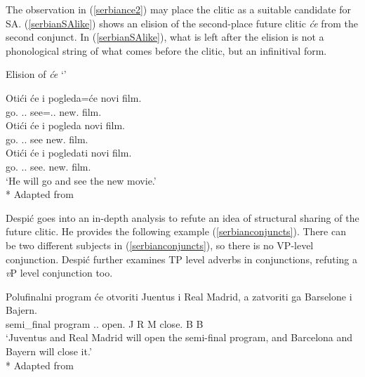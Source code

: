 The observation in (\ref{serbiance2}) may place the clitic as a suitable candidate for SA. (\ref{serbianSAlike}) shows an elision of the second-place future clitic \textit{\'{c}e} from the second conjunct. In (\ref{serbianSAlike}), what is left after the elision is not a phonological string of what comes before the clitic, but an infinitival form.

\begin{exe}
    \ex \label{serbianSAlike} Elision of \textit{\'{c}e} `{\Fut}'
    \begin{xlist}
        \ex \gll Oti\'{c}i \'{c}e i pogleda=\'{c}e novi film. \\ 
        go.{\Inf} {\Aux}.{\Tsg}.{\Fut} {\And} see={\Aux}.{\Tsg}.{\Fut} new.{\Acc} film.{\Acc} \\
        
        \ex \gll *Oti\'{c}i \'{c}e i pogleda novi film. \\ 
        go.{\Inf} {\Aux}.{\Tsg}.{\Fut} {\And} see new.{\Acc} film.{\Acc} \\
        
        \ex \gll Oti\'{c}i \'{c}e i pogledati novi film. \\ 
        go.{\Inf} {\Aux}.{\Tsg}.{\Fut} {\And} see.{\Inf} new.{\Acc} film.{\Acc} \\
        \glt `He will go and see the new movie.'\\*
        \hfill Adapted from \citet{despic2017suspended}
    \end{xlist}
\end{exe}

Despi\'{c} goes into an in-depth analysis to refute an idea of structural sharing of the future clitic. He provides the following example (\ref{serbianconjuncts}). There can be two different subjects in (\ref{serbianconjuncts}), so there is no VP-level conjunction. Despi\'c further examines TP level adverbs in conjunctions, refuting a \textit{v}P level conjunction too.

\begin{exe}
    \ex \label{serbianconjuncts}
    \gll Polufinalni program  \'{c}e otvoriti Juentus i {Real Madrid,} a zatvoriti ga Barselone i Bajern. \\ semi\_final program {\Aux}.{\Tsg}.{\Fut} open.{\Inf} J {\And} {R M} {\And} close.{\Inf} {\Tsg} B {\And} B \\
    \glt `Juventus and Real Madrid will open the semi-final program, and Barcelona and Bayern will close it.' \\*
    \hfill Adapted from \citet{despic2017suspended}
\end{exe}

